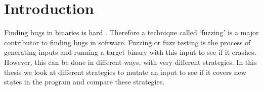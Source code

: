 

\chapter{Introduction}

\ifpdf
    \graphicspath{{1_introduction/figures/PNG/}{1_introduction/figures/PDF/}{1_introduction/figures/}}
\else
    \graphicspath{{1_introduction/figures/EPS/}{1_introduction/figures/}}
\fi





Finding bugs in binaries is hard \cite{aflfuzzer, bohme2017coverage}. Therefore a technique called `fuzzing' is a major contributor to finding bugs in software. Fuzzing or fuzz testing is the process of generating inputs and running a target binary with this input to see if it crashes. However, this can be done in different ways, with very different strategies. In this thesis we look at different strategies to mutate an input to see if it covers new states in the program and compare these strategies. 

